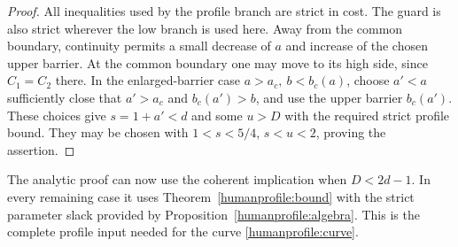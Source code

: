 \begin{proof}
All inequalities used by the profile branch are strict in cost.
The guard is also strict wherever the low branch is used here.
Away from the common boundary, continuity permits a small decrease
of \(a\) and increase of the chosen upper barrier. At the common
boundary one may move to its high side, since \(C_1=C_2\) there.
In the enlarged-barrier case \(a>a_c,\ b<b_c(a)\), choose
\(a'<a\) sufficiently close that \(a'>a_c\) and
\(b_c(a')>b\), and use the upper barrier \(b_c(a')\).
These choices give \(s=1+a'<d\) and some \(u>D\) with the
required strict profile bound. They may be chosen with
\(1<s<5/4\), \(s<u<2\), proving the assertion.
\end{proof}

The analytic proof can now use the coherent implication when
\(D<2d-1\). In every remaining case it uses
Theorem~\ref{humanprofile:bound} with the strict parameter slack
provided by Proposition~\ref{humanprofile:algebra}. This is the
complete profile input needed for the curve
\eqref{humanprofile:curve}.
